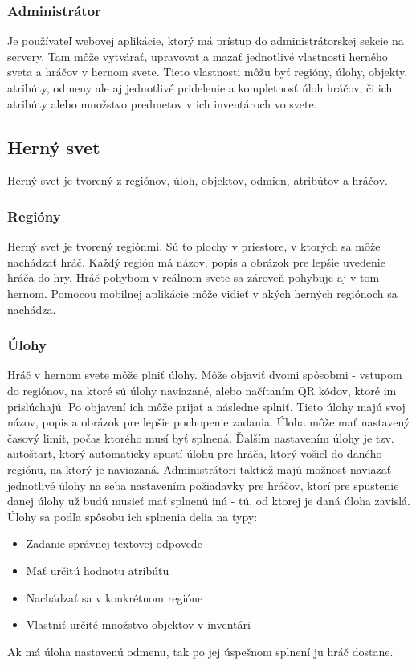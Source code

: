 \subsubsection{Administrátor}
Je používateľ webovej aplikácie, ktorý má prístup do administrátorskej sekcie na servery. Tam môže vytvárať, upravovať a mazať jednotlivé vlastnosti herného sveta a hráčov v hernom svete. Tieto vlastnosti môžu byť regióny, úlohy, objekty, atribúty, odmeny ale aj jednotlivé pridelenie a kompletnosť úloh hráčov, či ich atribúty alebo množstvo predmetov v ich inventároch   vo svete. 

\subsection{Herný svet}
Herný svet je tvorený z regiónov, úloh, objektov, odmien, atribútov a hráčov.

\subsubsection{Regióny}
Herný svet je tvorený regiónmi. Sú to plochy v priestore, v ktorých sa môže nachádzať hráč. Každý región má názov, popis a obrázok pre lepšie uvedenie hráča do hry. Hráč pohybom v reálnom svete sa zároveň pohybuje aj v tom hernom. Pomocou mobilnej aplikácie môže vidieť v akých herných regiónoch sa nachádza.

\subsubsection{Úlohy}
Hráč v hernom svete môže plniť úlohy. Môže objaviť dvomi spôsobmi - vstupom do regiónov, na ktoré sú úlohy naviazané, alebo načítaním QR kódov, ktoré im prislúchajú. Po objavení ich môže prijať a následne splniť. Tieto úlohy majú svoj názov, popis a obrázok pre lepšie pochopenie zadania. Úloha môže mať nastavený časový limit, počas ktorého musí byť splnená. Ďalším nastavením úlohy je tzv. autoštart, ktorý automaticky spustí úlohu pre hráča, ktorý vošiel do daného regiónu, na ktorý je naviazaná. Administrátori taktiež majú možnosť naviazať jednotlivé úlohy na seba nastavením požiadavky pre hráčov, ktorí pre spustenie danej úlohy už budú musieť mať splnenú inú - tú, od ktorej je daná úloha zavislá. Úlohy sa podľa spôsobu ich splnenia delia na typy:
\begin{itemize}
	\item Zadanie správnej textovej odpovede
	\item Mať určitú hodnotu atribútu
	\item Nachádzať sa v konkrétnom regióne
	\item Vlastniť určité množstvo objektov v inventári
\end{itemize}
Ak má úloha nastavenú odmenu, tak po jej úspešnom splnení ju hráč dostane.


